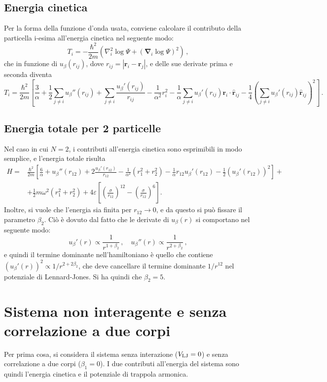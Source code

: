 \documentclass[a4paper, titlepage]{article}
\begin{document}
\subsection{Energia cinetica}
Per la forma della funzione d'onda usata, conviene calcolare il contributo della particella i-esima all'energia cinetica nel seguente modo:
\[
T_i = -\frac{\hbar^2}{2m}\left(\nabla_i^2\log\Psi + (\boldsymbol{\nabla}_i\log\Psi)^2\right)\, ,
\]
che in funzione di $u_\beta(r_{ij})$, dove $r_{ij} = |\mathbf{r}_i - \mathbf{r}_j|$, e delle sue derivate prima e seconda diventa
\[
T_i = \frac{\hbar^2}{2m}
\left[
\frac{3}{\alpha} + 
\frac{1}{2}\sum_{j\neq i} u_\beta''(r_{ij}) + 
\sum_{j\neq i} \frac{u_\beta'(r_{ij})}{r_{ij}} -
\frac{1}{\alpha^2}r_i^2 - 
\frac{1}{\alpha} \sum_{j\neq i} u_\beta'(r_{ij}) \mathbf{r}_i \cdot \hat{\mathbf{r}}_{ij} - 
\frac{1}{4}\left(\sum_{j\neq i} u_\beta'(r_{ij}) \hat{\mathbf{r}}_{ij}\right)^2
\right]\, .
\]

\subsection{Energia totale per 2 particelle}
Nel caso in cui $N = 2$, i contributi all'energia cinetica sono esprimibili in modo semplice, e l'energia totale risulta
\begin{equation}
    \begin{split}
    H = &\frac{\hbar^2}{2m}
    \left[
    \frac{6}{\alpha} +
    u_\beta''(r_{12}) +
    2\frac{u_\beta'(r_{12})}{r_{12}} -
    \frac{1}{\alpha^2}(r_1^2 + r_2^2) - 
    \frac{1}{\alpha}r_{12}u_\beta'(r_{12}) - 
    \frac{1}{2}(u_\beta'(r_{12}))^2
    \right] + \\
    &+\frac{1}{2}m\omega^2(r_1^2 + r_2^2) + 
    4\varepsilon\left[\left(\frac{\sigma}{r_{12}}\right)^{12} - \left(\frac{\sigma}{r_{12}}\right)^{6}\right].
    \end{split}
\end{equation}
Inoltre, si vuole che l'energia sia finita per $r_{12}\rightarrow 0$, e da questo si può fissare il parametro $\beta_2$. Ciò è dovuto dal fatto che le derivate di $u_\beta(r)$ si comportano nel seguente modo:
\[
    u_\beta'(r) \propto \frac{1}{r^{1+\beta_2}}\, , \quad u_\beta''(r) \propto \frac{1}{r^{2+\beta_2}}\, ,
\]
e quindi il termine dominante nell'hamiltoniano è quello che contiene $(u_\beta'(r))^2 \propto 1/r^{2+2\beta_2}$, che deve cancellare il termine dominante $1/r^{12}$ nel potenziale di Lennard-Jones. Si ha quindi che $\beta_2 = 5$.

\section{Sistema non interagente e senza correlazione a due corpi}
Per prima cosa, si considera il sistema senza interazione ($V_{\rm LJ} = 0$) e senza correlazione a due corpi ($\beta_1 = 0$). I due contributi all'energia del sistema sono quindi l'energia cinetica e il potenziale di trappola armonica.
\end{document}
